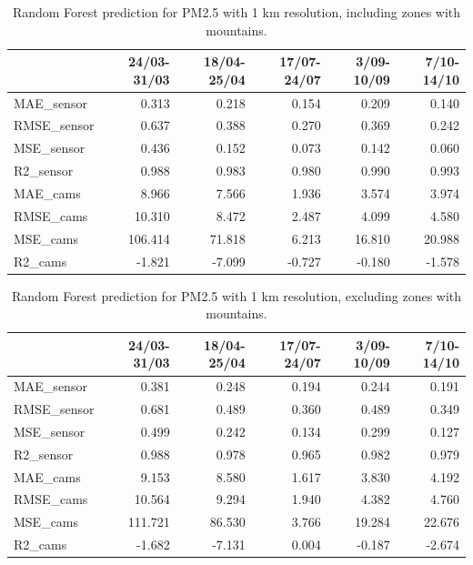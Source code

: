 \begin{table}[H]
\begin{tabular}{lrrrrr}
\toprule
 &  24/03-31/03 &  18/04-25/04 &  17/07-24/07 &  3/09-10/09 &  7/10-14/10 \\
\midrule
 MAE\_sensor &        0.313 &        0.218 &        0.154 &       0.209 &       0.140 \\
RMSE\_sensor &        0.637 &        0.388 &        0.270 &       0.369 &       0.242 \\
 MSE\_sensor &        0.436 &        0.152 &        0.073 &       0.142 &       0.060 \\
  R2\_sensor &        0.988 &        0.983 &        0.980 &       0.990 &       0.993 \\
   MAE\_cams &        8.966 &        7.566 &        1.936 &       3.574 &       3.974 \\
  RMSE\_cams &       10.310 &        8.472 &        2.487 &       4.099 &       4.580 \\
   MSE\_cams &      106.414 &       71.818 &        6.213 &      16.810 &      20.988 \\
    R2\_cams &       -1.821 &       -7.099 &       -0.727 &      -0.180 &      -1.578 \\
\bottomrule
\end{tabular}
\caption{Random Forest prediction for PM2.5 with 1 km resolution, including zones with mountains.}
\end{table}
\begin{table}[H]
\begin{tabular}{lrrrrr}
\toprule
 &  24/03-31/03 &  18/04-25/04 &  17/07-24/07 &  3/09-10/09 &  7/10-14/10 \\
\midrule
 MAE\_sensor &        0.381 &        0.248 &        0.194 &       0.244 &       0.191 \\
RMSE\_sensor &        0.681 &        0.489 &        0.360 &       0.489 &       0.349 \\
 MSE\_sensor &        0.499 &        0.242 &        0.134 &       0.299 &       0.127 \\
  R2\_sensor &        0.988 &        0.978 &        0.965 &       0.982 &       0.979 \\
   MAE\_cams &        9.153 &        8.580 &        1.617 &       3.830 &       4.192 \\
  RMSE\_cams &       10.564 &        9.294 &        1.940 &       4.382 &       4.760 \\
   MSE\_cams &      111.721 &       86.530 &        3.766 &      19.284 &      22.676 \\
    R2\_cams &       -1.682 &       -7.131 &        0.004 &      -0.187 &      -2.674 \\
\bottomrule
\end{tabular}
\caption{Random Forest prediction for PM2.5 with 1 km resolution, excluding zones with mountains.}
\end{table}
